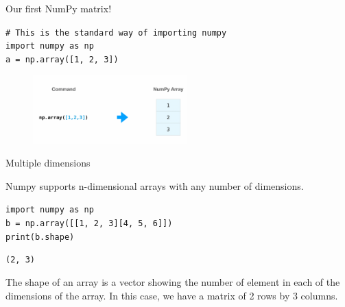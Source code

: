 \documentclass[9pt, aspectratio=169]{beamer}
\begin{document}
\begin{frame}
    {Our first NumPy matrix!}

    \begin{codebox}
        \texttt{\# This is the standard way of importing numpy\\
            import numpy as np\\
            a = np.array([1, 2, 3])
        }
    \end{codebox}

    \begin{figure}
        \centering
        \includegraphics[height=100px]{np_array.png}
    \end{figure}
\end{frame}

\begin{frame}
    {Multiple dimensions}

    Numpy supports n-dimensional arrays with any number of dimensions.

    \begin{codebox}
        \texttt{import numpy as np\\
            b = np.array([[1, 2, 3][4, 5, 6]])\\
            print(b.shape)
        }
    \end{codebox}

    \begin{codebox}
        {
            \texttt{(2, 3)}
        }
    \end{codebox}

    The shape of an array is a vector showing the number of element in each of the dimensions of the array. In this case, we have a matrix of 2 rows by 3 columns.
\end{frame}
\end{document}
